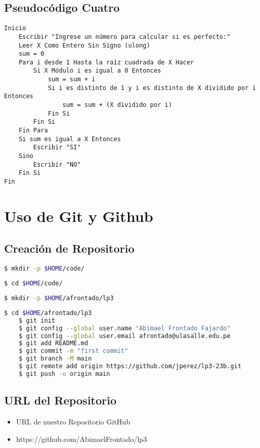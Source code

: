 \documentclass{article}
\begin{document}
\subsection{Pseudocódigo Cuatro}
\lstset{language=pseudocode}
\begin{lstlisting}
Inicio
    Escribir "Ingrese un número para calcular si es perfecto:"
    Leer X Como Entero Sin Signo (ulong)
    sum = 0
    Para i desde 1 Hasta la raíz cuadrada de X Hacer
        Si X Módulo i es igual a 0 Entonces
            sum = sum + i
            Si i es distinto de 1 y i es distinto de X dividido por i Entonces
                sum = sum + (X dividido por i)
            Fin Si
        Fin Si
    Fin Para
    Si sum es igual a X Entonces
        Escribir "SI"
    Sino
        Escribir "NO"
    Fin Si
Fin
\end{lstlisting}

    \section{Uso de Git y Github}
    \subsection{Creación de Repositorio}
	\begin{lstlisting}[language=bash,caption={Creando directorio de trabajo}]
	$ mkdir -p $HOME/code/
	\end{lstlisting}
	\begin{lstlisting}[language=bash,caption={Dirigiéndonos al directorio de trabajo}]
	$ cd $HOME/code/
	\end{lstlisting}
	\begin{lstlisting}[language=bash,caption={Creando directorio para repositorio GitHub}]
	$ mkdir -p $HOME/afrontado/lp3
	\end{lstlisting}
	\begin{lstlisting}[language=bash,caption={Inicializando directorio para repositorio GitHub}]
	$ cd $HOME/afrontado/lp3
	$ git init
	$ git config --global user.name "Abimael Frontado Fajardo"
	$ git config --global user.email afrontado@ulasalle.edu.pe
	$ git add README.md
	$ git commit -m "first commit"
	$ git branch -M main
	$ git remote add origin https://github.com/jperez/lp3-23b.git
	$ git push -u origin main
	\end{lstlisting}
    \vspace{0.5cm}
	\subsection{URL del Repositorio}
	   \begin{itemize}
        \item URL de nuestro Repositorio GitHub
        \item https://github.com/AbimaelFrontado/lp3
      \end{itemize}
	\vspace{0.5cm}
\end{document}
